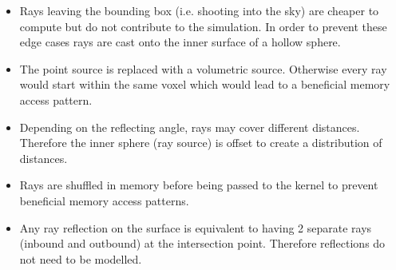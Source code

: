 \begin{itemize}
	\item Rays leaving the bounding box (i.e. shooting into the sky) are cheaper to compute but do not contribute to the simulation.
	      In order to prevent these edge cases rays are cast onto the inner surface of a hollow sphere.
	\item The point source is replaced with a volumetric source. Otherwise every ray would start within the same voxel which would lead to a beneficial memory access pattern.
	\item Depending on the reflecting angle, rays may cover different distances. Therefore the inner sphere (ray source) is offset to create a distribution of distances.
	\item Rays are shuffled in memory before being passed to the kernel to prevent beneficial memory access patterns.
	\item Any ray reflection on the surface is equivalent to having 2 separate rays (inbound and outbound) at the intersection point. Therefore reflections do not need to be modelled.
\end{itemize}


